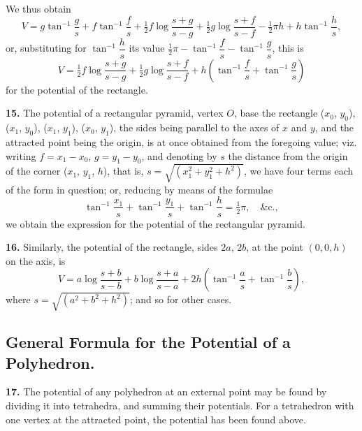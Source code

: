 \documentclass[11pt,a4paper]{book}
\begin{document}
We thus obtain
\[
V = g\tan^{-1}\frac{g}{s} + f\tan^{-1}\frac{f}{s}
  + \tfrac{1}{2}f\log\frac{s+g}{s-g} + \tfrac{1}{2}g\log\frac{s+f}{s-f}
  - \tfrac{1}{2}\pi h + h\tan^{-1}\frac{h}{s},
\]
or, substituting for $\tan^{-1}\dfrac{h}{s}$ its value
$\tfrac{1}{2}\pi - \tan^{-1}\dfrac{f}{s} - \tan^{-1}\dfrac{g}{s}$, this is
\[
V = \tfrac{1}{2}f\log\frac{s+g}{s-g} + \tfrac{1}{2}g\log\frac{s+f}{s-f}
  + h\left(\tan^{-1}\frac{f}{s} + \tan^{-1}\frac{g}{s}\right)
\]
for the potential of the rectangle.

\newpage
\noindent\textbf{15.}\quad
The potential of a rectangular pyramid, vertex $O$, base the rectangle
($x_0$, $y_0$), ($x_1$, $y_0$), ($x_1$, $y_1$), ($x_0$, $y_1$), the sides being
parallel to the axes of $x$ and $y$, and the attracted point being the
origin, is at once obtained from the foregoing value; viz. writing
$f=x_1-x_0$, $g=y_1-y_0$, and denoting by $s$ the distance from the origin
of the corner ($x_1$, $y_1$, $h$), that is, $s=\sqrt{(x_1^2+y_1^2+h^2)}$, we
have four terms each of the form in question; or, reducing by means of the
formulae
\[
\tan^{-1}\frac{x_1}{s} + \tan^{-1}\frac{y_1}{s} + \tan^{-1}\frac{h}{s}
= \tfrac{1}{2}\pi, \quad \&\text{c.},
\]
we obtain the expression for the potential of the rectangular pyramid.

\smallskip\noindent\textbf{16.}\quad
Similarly, the potential of the rectangle, sides $2a$, $2b$, at the point
$(0,0,h)$ on the axis, is
\[
V = a\log\frac{s+b}{s-b} + b\log\frac{s+a}{s-a}
  + 2h\left(\tan^{-1}\frac{a}{s} + \tan^{-1}\frac{b}{s}\right),
\]
where $s=\sqrt{(a^2+b^2+h^2)}$; and so for other cases.

\subsection*{General Formula for the Potential of a Polyhedron.}

\smallskip\noindent\textbf{17.}\quad
The potential of any polyhedron at an external point may be found by
dividing it into tetrahedra, and summing their potentials. For a tetrahedron
with one vertex at the attracted point, the potential has been found above.
\end{document}
